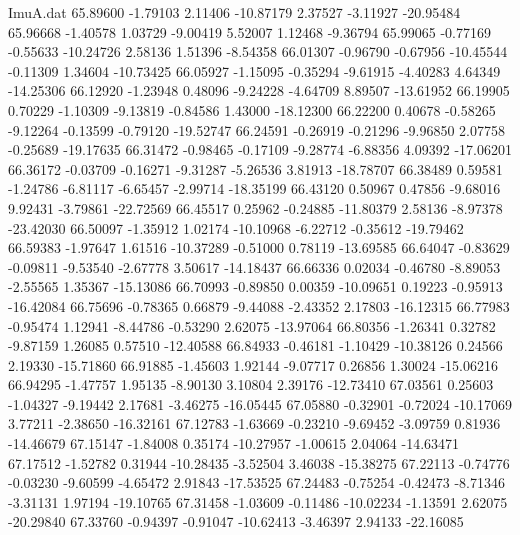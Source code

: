 \begin{filecontents}{ImuA.dat}
  65.89600   -1.79103    2.11406  -10.87179    2.37527   -3.11927  -20.95484
  65.96668   -1.40578    1.03729   -9.00419    5.52007    1.12468   -9.36794
  65.99065   -0.77169   -0.55633  -10.24726    2.58136    1.51396   -8.54358
  66.01307   -0.96790   -0.67956  -10.45544   -0.11309    1.34604  -10.73425
  66.05927   -1.15095   -0.35294   -9.61915   -4.40283    4.64349  -14.25306
  66.12920   -1.23948    0.48096   -9.24228   -4.64709    8.89507  -13.61952
  66.19905    0.70229   -1.10309   -9.13819   -0.84586    1.43000  -18.12300
  66.22200    0.40678   -0.58265   -9.12264   -0.13599   -0.79120  -19.52747
  66.24591   -0.26919   -0.21296   -9.96850    2.07758   -0.25689  -19.17635
  66.31472   -0.98465   -0.17109   -9.28774   -6.88356    4.09392  -17.06201
  66.36172   -0.03709   -0.16271   -9.31287   -5.26536    3.81913  -18.78707
  66.38489    0.59581   -1.24786   -6.81117   -6.65457   -2.99714  -18.35199
  66.43120    0.50967    0.47856   -9.68016    9.92431   -3.79861  -22.72569
  66.45517    0.25962   -0.24885  -11.80379    2.58136   -8.97378  -23.42030
  66.50097   -1.35912    1.02174  -10.10968   -6.22712   -0.35612  -19.79462
  66.59383   -1.97647    1.61516  -10.37289   -0.51000    0.78119  -13.69585
  66.64047   -0.83629   -0.09811   -9.53540   -2.67778    3.50617  -14.18437
  66.66336    0.02034   -0.46780   -8.89053   -2.55565    1.35367  -15.13086
  66.70993   -0.89850    0.00359  -10.09651    0.19223   -0.95913  -16.42084
  66.75696   -0.78365    0.66879   -9.44088   -2.43352    2.17803  -16.12315
  66.77983   -0.95474    1.12941   -8.44786   -0.53290    2.62075  -13.97064
  66.80356   -1.26341    0.32782   -9.87159    1.26085    0.57510  -12.40588
  66.84933   -0.46181   -1.10429  -10.38126    0.24566    2.19330  -15.71860
  66.91885   -1.45603    1.92144   -9.07717    0.26856    1.30024  -15.06216
  66.94295   -1.47757    1.95135   -8.90130    3.10804    2.39176  -12.73410
  67.03561    0.25603   -1.04327   -9.19442    2.17681   -3.46275  -16.05445
  67.05880   -0.32901   -0.72024  -10.17069    3.77211   -2.38650  -16.32161
  67.12783   -1.63669   -0.23210   -9.69452   -3.09759    0.81936  -14.46679
  67.15147   -1.84008    0.35174  -10.27957   -1.00615    2.04064  -14.63471
  67.17512   -1.52782    0.31944  -10.28435   -3.52504    3.46038  -15.38275
  67.22113   -0.74776   -0.03230   -9.60599   -4.65472    2.91843  -17.53525
  67.24483   -0.75254   -0.42473   -8.71346   -3.31131    1.97194  -19.10765
  67.31458   -1.03609   -0.11486  -10.02234   -1.13591    2.62075  -20.29840
  67.33760   -0.94397   -0.91047  -10.62413   -3.46397    2.94133  -22.16085

\end{filecontents}
